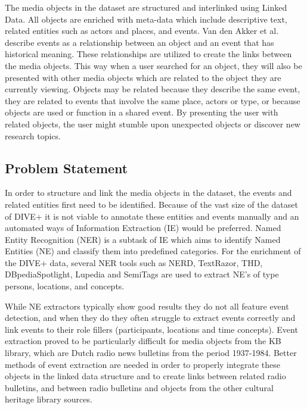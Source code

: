 \documentclass[a4paper, 10pt, conference]{ieeeconf}      %
\begin{document}
The media objects in the dataset are structured and interlinked using Linked Data. All objects are enriched with meta-data which include descriptive text, related entities such as actors and places, and events. Van den Akker et al. \cite{van2011digital} describe events as a relationship between an object and an event that has historical meaning. These relationships are utilized to create the links between the media objects. This way when a user searched for an object, they will also be presented with other media objects which are related to the object they are currently viewing. Objects may be related because they describe the same event, they are related to events that involve the same place, actors or type, or because objects are used or function in a shared event. By presenting the user with related objects, the user might stumble upon unexpected objects or discover new research topics. 

\subsection{Problem Statement}

In order to structure and link the media objects in the dataset, the events and related entities first need to be identified. Because of the vast size of the dataset of DIVE+ it is not viable to annotate these entities and events manually and an automated ways of Information Extraction (IE) would be preferred. Named Entity Recognition (NER) is a subtask of IE which aims to identify Named Entities (NE) and classify them into predefined categories. For the enrichment of the DIVE+ data, several NER tools such as NERD, TextRazor, THD, DBpediaSpotlight, Lupedia and SemiTags are used to extract NE's of type persons, locations, and concepts\cite{de2015dive}.

While NE extractors typically show good results\cite{gangemi2013comparison} they do not all feature event detection, and when they do they often struggle to extract events correctly and link events to their role fillers (participants, locations and time concepts). Event extraction proved to be particularly difficult for media objects from the KB library, which are Dutch radio news bulletins from the period 1937-1984. Better methods of event extraction are needed in order to properly integrate these objects in the linked data structure and to create links between related radio bulletins, and between radio bulletins and objects from the other cultural heritage library sources.
\end{document}
